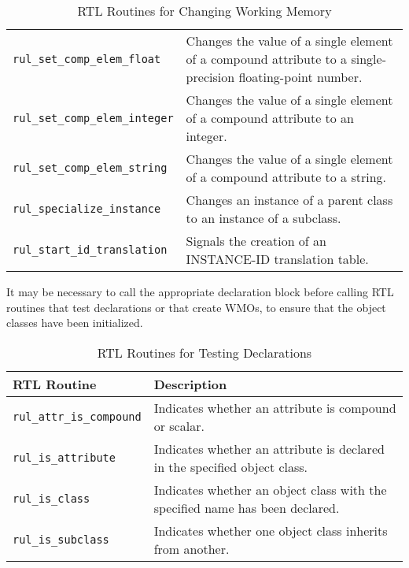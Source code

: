 \begin{table}[h]
\begin{tabularx}{\columnwidth}{lX}
    \verb|rul_set_comp_elem_float|   & Changes the value of a single element of a    
                                       compound attribute to a single-precision      
                                       floating-point number.                        \\
    \verb|rul_set_comp_elem_integer| & Changes the value of a single element of a    
                                       compound attribute to an integer.             \\
    \verb|rul_set_comp_elem_string|  & Changes the value of a single element of a    
                                       compound attribute to a string.               \\
    \verb|rul_specialize_instance|   & Changes an instance of a parent class to an   
                                       instance of a subclass.                       \\
    \verb|rul_start_id_translation|  & Signals the creation of an INSTANCE-ID        
                                       translation table.                            \\
    \bottomrule
  \end{tabularx}
  \caption{RTL Routines for Changing Working Memory}
  \label{t:6-6}
\end{table}

\begin{note}
  It may be necessary to call the appropriate declaration block before
  calling RTL routines that test declarations or that create WMOs, to
  ensure that the object classes have been initialized.
\end{note}

\begin{table}[h]
  \begin{tabularx}{\columnwidth}{lX}
    \toprule
    RTL Routine & Description \\
    \midrule
    \verb|rul_attr_is_compound|  & Indicates whether an attribute is compound or
                                   scalar. \\
    \verb|rul_is_attribute| & Indicates whether an attribute is declared
                              in the
                              specified object class. \\
    \verb|rul_is_class| & Indicates whether an object class with the
                          specified name has been declared. \\
    \verb|rul_is_subclass| & Indicates whether one object class inherits
                             from another. \\
    \bottomrule
  \end{tabularx}  
  \caption{RTL Routines for Testing Declarations}
  \label{t:6-7}
\end{table}

